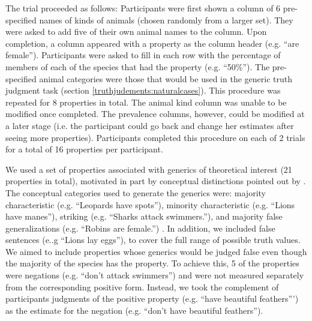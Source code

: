 \documentclass[10pt,letterpaper]{article}
\begin{document}
The trial proceeded as follows:
Participants were first shown a column of 6 pre-specified names of kinds of animals (chosen randomly from a larger set). 
They were asked to add five of their own animal names to the column. 
Upon completion, a column appeared with a property as the column header (e.g. ``are female'').
Participants were asked to fill in each row with the percentage of members of each of the species that had the property (e.g. ``50\%'').
The pre-specified animal categories were those that would be used in the generic truth judgment task (section \ref{truthjudements:naturalcases}).
This procedure was repeated for 8 properties in total. 
The animal kind column was unable to be modified once completed. 
The prevalence columns, however, could be modified at a later stage (i.e. the participant could go back and change her estimates after seeing more properties). 
Participants completed this procedure on each of 2 trials for a total of 16 properties per participant.


We used a set of properties associated with generics of theoretical interest (21 properties in total), motivated in part by conceptual distinctions pointed out by . 
The conceptual categories used to generate the generics were: majority characteristic (e.g. ``Leopards have spots''), minority characteristic (e.g. ``Lions have manes''), striking (e.g. ``Sharks attack swimmers.''), and majority false generalizations (e.g. ``Robins are female.'') \cite{Prasada2013}. 
In addition, we included false sentences (e..g ``Lions lay eggs''), to cover the full range of possible truth values.
We aimed to include properties whose generics would be judged false even though the majority of the species has the property. To achieve this, 5 of the properties were negations (e.g. ``don't attack swimmers'') and were not measured separately from the corresponding positive form. 
Instead, we took the complement of participants judgments of the positive property (e.g. ``have beautiful feathers''') as the estimate for the negation (e.g. ``don't have beautiful feathers'').
\end{document}

